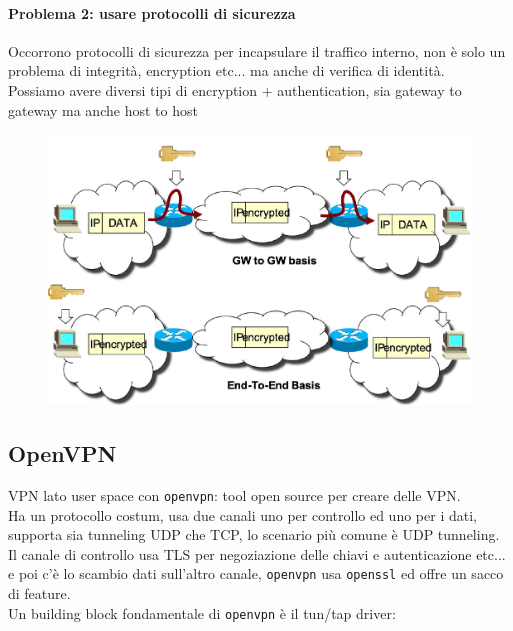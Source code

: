 \documentclass[12pt, oneside]{extbook} %
\begin{document}
\paragraph{Problema 2: usare protocolli di sicurezza} Occorrono protocolli di sicurezza per incapsulare il traffico interno, non è solo un problema di integrità, encryption etc... ma anche di verifica di identità.
\\Possiamo avere diversi tipi di encryption + authentication, sia gateway to gateway ma anche host to host\\
\begin{figure}[h!]
    \centering
    \includegraphics[scale=0.5]{../../immagini/vpn_types}
\end{figure}

\subsection{OpenVPN}
VPN lato user space con \texttt{openvpn}: tool open source per creare delle VPN.
\\Ha un protocollo costum, usa due canali uno per controllo ed uno per i dati, supporta sia tunneling UDP che TCP, lo scenario più comune è UDP tunneling.
\\Il canale di controllo usa TLS per negoziazione delle chiavi e autenticazione etc... e poi c'è lo scambio dati sull'altro canale, \texttt{openvpn} usa \texttt{openssl} ed offre un sacco di feature.
\\Un building block fondamentale di \texttt{openvpn} è il tun/tap driver:
\end{document}
